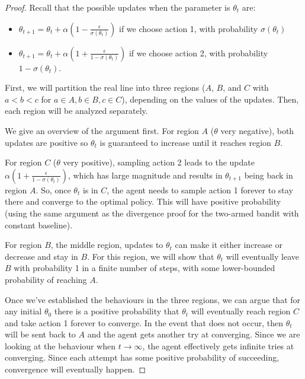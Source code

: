 \begin{proof}

Recall that the possible updates when the parameter is $\theta_t$ are:
\begin{itemize}
    \item $\theta_{t+1} = \theta_t + \alpha(1-\frac{\epsilon}{\sigma(\theta_t)})$ if we choose action 1, with probability $\sigma(\theta_t)$ 
    \item $\theta_{t+1} = \theta_t + \alpha(1+\frac{\epsilon}{1- \sigma(\theta_t)})$ if we choose action 2, with probability $1-\sigma(\theta_t)$.
\end{itemize}

First, we will partition the real line into three regions ($A$, $B$, and $C$ with $a < b < c$ for $a\in A, b \in B, c \in C$), depending on the values of the updates. Then, each region will be analyzed separately.

We give an overview of the argument first.
For region $A$ ($\theta$ very negative), both updates are positive so $\theta_t$ is guaranteed to increase until it reaches region $B$.

For region $C$ ($\theta$ very positive), sampling action 2 leads to the update $\alpha(1+\frac{\epsilon}{1- \sigma(\theta_t)})$, which has large magnitude and results in $\theta_{t+1}$ being back in region $A$. So, once $\theta_t$ is in $C$, the agent needs to sample action 1 forever to stay there and converge to the optimal policy. This will have positive probability (using the same argument as the divergence proof for the two-armed bandit with constant baseline). 

For region $B$, the middle region, updates to $\theta_t$ can make it either increase or decrease and stay in $B$. For this region, we will show that $\theta_t$ will eventually leave $B$ with probability 1 in a finite number of steps, with some lower-bounded probability of reaching $A$. 

Once we've established the behaviours in the three regions, we can argue that for any initial $\theta_0$ there is a positive probability that $\theta_t$ will eventually reach region $C$ and take action 1 forever to converge. In the event that does not occur, then $\theta_t$ will be sent back to $A$ and the agent gets another try at converging. Since we are looking at the behaviour when $t \xrightarrow{} \infty$, the agent effectively gets infinite tries at converging. Since each attempt has some positive probability of succeeding, convergence will eventually happen.



\end{proof}
